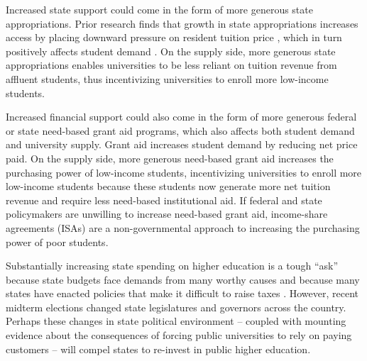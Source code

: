 \documentclass[twoside]{article}
\begin{document}
Increased state support could come in the form of more generous state appropriations.  Prior research finds that growth in state appropriations increases access by placing downward pressure on resident tuition price \citep{RN2609}, which in turn positively affects student demand \citep{RN3068}.  On the supply side, more generous state appropriations enables universities to be less reliant on tuition revenue from affluent students, thus incentivizing universities to enroll more low-income students.

Increased financial support could also come in the form of more generous federal or state need-based grant aid programs, which also affects both student demand and university supply. Grant aid increases student demand by reducing net price paid.  On the supply side, more generous need-based grant aid increases the purchasing power of low-income students, incentivizing universities to enroll more low-income students because these students now generate more net tuition revenue and require less need-based institutional aid. If federal and state policymakers are unwilling to increase need-based grant aid, income-share agreements (ISAs) are a non-governmental approach to increasing the purchasing power of poor students.

Substantially increasing state spending on higher education is a tough ``ask'' because state budgets face demands from many worthy causes \citep{RN1652} and because many states have enacted policies that make it difficult to raise taxes \citep{RN1646}.  However, recent midterm elections changed state legislatures and governors across the country.  Perhaps these changes in state political environment -- coupled with mounting evidence about the consequences of forcing public universities to rely on paying customers -- will compel states to re-invest in public higher education.
\end{document}
